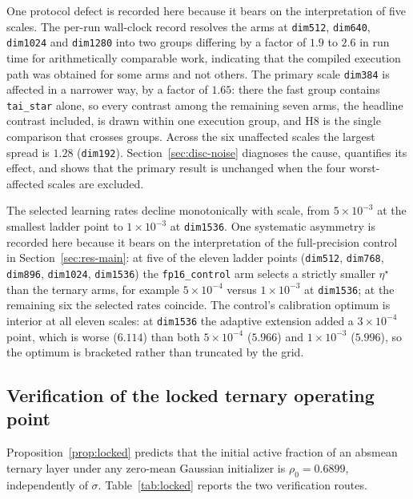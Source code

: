 \documentclass[final,5p,times,twocolumn]{elsarticle}
\theoremstyle{remark}
\newcommand{\rhoz}{\rho_{0}}
\begin{document}
One protocol defect is recorded here because it bears on the interpretation of
five scales. The per-run wall-clock record resolves the arms at
\texttt{dim512}, \texttt{dim640}, \texttt{dim1024} and \texttt{dim1280} into
two groups differing by a factor of $1.9$ to $2.6$ in run time for
arithmetically comparable work, indicating that the compiled execution path was
obtained for some arms and not others. The primary scale \texttt{dim384} is
affected in a narrower way, by a factor of $1.65$: there the fast group
contains \texttt{tai\_star} alone, so every contrast among the remaining seven
arms, the headline contrast included, is drawn within one execution group, and
H8 is the single comparison that crosses groups. Across the six unaffected
scales the largest spread is $1.28$ (\texttt{dim192}).
Section~\ref{sec:disc-noise} diagnoses the cause,
quantifies its effect, and shows that the primary result is unchanged when the
four worst-affected scales are excluded.

The selected learning rates decline monotonically with scale, from
$5\times 10^{-3}$ at the smallest ladder point to $1\times 10^{-3}$ at
\texttt{dim1536}. One systematic asymmetry is recorded here because it bears on
the interpretation of the full-precision control in
Section~\ref{sec:res-main}: at five of the eleven ladder points
(\texttt{dim512}, \texttt{dim768}, \texttt{dim896}, \texttt{dim1024},
\texttt{dim1536}) the \texttt{fp16\_control} arm selects a strictly smaller
$\eta^\star$ than the ternary arms, for example $5\times 10^{-4}$ versus
$1\times 10^{-3}$ at \texttt{dim1536}; at the remaining six the selected rates
coincide. The control's calibration optimum is interior at all eleven
scales: at \texttt{dim1536} the adaptive extension
added a $3\times 10^{-4}$ point, which is worse ($6.114$) than both
$5\times 10^{-4}$ ($5.966$) and $1\times 10^{-3}$ ($5.996$), so the optimum is
bracketed rather than truncated by the grid.

\subsection{Verification of the locked ternary operating point}
\label{sec:res-locked}

Proposition~\ref{prop:locked} predicts that the initial active fraction of an
absmean ternary layer under any zero-mean Gaussian initializer is
$\rhoz = 0.6899$, independently of $\sigma$. Table~\ref{tab:locked} reports the
two verification routes.
\end{document}
